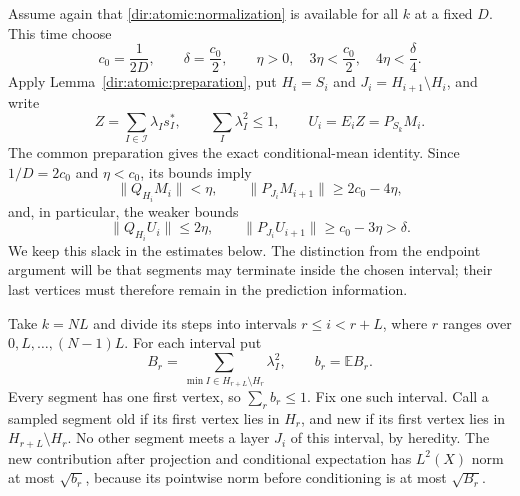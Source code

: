 Assume again that \eqref{dir:atomic:normalization} is available for all
$k$ at a fixed $D$.  This time choose
\begin{equation}\label{dir:atomic:status-constants}
 c_0=\frac1{2D},\qquad \delta=\frac{c_0}{2},\qquad
 \eta>0,\quad3\eta<\frac{c_0}{2},\quad4\eta<\frac\delta4.
\end{equation}
Apply Lemma~\ref{dir:atomic:preparation}, put $H_i=S_i$ and
$J_i=H_{i+1}\setminus H_i$, and write
\[
 Z=\sum_{I\in\mathcal I}\lambda_I s_I^*,\qquad
 \sum_I\lambda_I^2\le1,\qquad U_i=E_iZ=P_{S_k}M_i.
\]
The common preparation gives the exact conditional-mean identity.
Since $1/D=2c_0$ and $\eta<c_0$, its bounds imply
\begin{equation}\label{dir:atomic:status-selected}
 \|Q_{H_i}M_i\|<\eta,\qquad
 \|P_{J_i}M_{i+1}\|\ge2c_0-4\eta,
\end{equation}
and, in particular, the weaker bounds
\begin{equation}\label{dir:atomic:status-layer}
 \|Q_{H_i}U_i\|\le2\eta,\qquad
 \|P_{J_i}U_{i+1}\|\ge c_0-3\eta>\delta.
\end{equation}
We keep this slack in the estimates below. The distinction from the
endpoint argument will be that segments may terminate inside the chosen
interval; their last vertices must therefore remain in the prediction
information.

Take $k=NL$ and divide its steps into intervals $r\le i<r+L$, where
$r$ ranges over $0,L,\ldots,(N-1)L$.  For each interval put
\[
 B_r=\sum_{\min I\in H_{r+L}\setminus H_r}\lambda_I^2,
 \qquad b_r=\mathbb E B_r.
\]
Every segment has one first vertex, so $\sum_r b_r\le1$.  Fix one such
interval.  Call a sampled segment old if its first vertex lies in $H_r$,
and new if its first vertex lies in $H_{r+L}\setminus H_r$.
No other segment meets a layer $J_i$ of this interval, by heredity.
The new contribution after projection and conditional expectation has
$L^2(X)$ norm at most $\sqrt{b_r}$, because its pointwise norm before
conditioning is at most $\sqrt{B_r}$.

